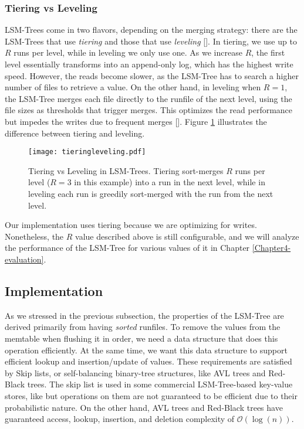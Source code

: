 \subsubsection{Tiering vs Leveling}

LSM-Trees come in two flavors, depending on the merging strategy: there are the LSM-Trees that use \textit{tiering} and those that use \textit{leveling} [\cite{compactionary}]. In tiering, we use up to $R$ runs per level, while in leveling we only use one.
As we increase $R$, the first level essentially transforms into an append-only log, which has the highest write speed. However, the reads become slower, as the LSM-Tree has to search a higher number of files to retrieve a value. On the other hand, in leveling when $R=1$, the LSM-Tree merges each file directly to the runfile of the next level, using the file sizes as thresholds that trigger merges. This optimizes the read performance but impedes the writes due to frequent merges [\cite{lsm-design-space}]. Figure \ref{fig:tiering-leveling} illustrates the difference between tiering and leveling.

\vspace{20px}
\begin{figure}[h]
    \centering
    \texttt{[image: tieringleveling.pdf]}
    \caption{Tiering vs Leveling in LSM-Trees. Tiering sort-merges $R$ runs per level ($R=3$ in this example) into a run in the next level, while in leveling each run is greedily sort-merged with the run from the next level.}
    \label{fig:tiering-leveling}
\end{figure}
\vspace{20px}

Our implementation uses tiering because we are optimizing for writes. Nonetheless, the $R$ value described above is still configurable, and we will analyze the performance of the LSM-Tree for various values of it in Chapter \ref{Chapter4-evaluation}.

\subsection{Implementation}

As we stressed in the previous subsection, the properties of the LSM-Tree are derived primarily from having \textit{sorted} runfiles.
To remove the values from the memtable when flushing it in order, we need a data structure that does this operation efficiently.
At the same time, we want this data structure to support efficient lookup and insertion/update of values.
These requirements are satisfied by Skip lists, or self-balancing binary-tree structures, like AVL trees and Red-Black trees. The skip list is used in some commercial LSM-Tree-based key-value stores, like \cite{leveldb} but operations on them are not guaranteed to be efficient due to their probabilistic nature. On the other hand, AVL trees and Red-Black trees have guaranteed access, lookup, insertion, and deletion complexity of $\mathcal{O}(\log{}(n))$.

